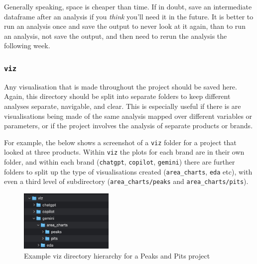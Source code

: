 \documentclass[
  letterpaper,
  DIV=11,
  numbers=noendperiod]{scrreprt}
\begin{document}
\begin{tcolorbox}[enhanced jigsaw, colback=white, opacitybacktitle=0.6, coltitle=black, left=2mm, breakable, bottomtitle=1mm, toptitle=1mm, toprule=.15mm, colframe=quarto-callout-tip-color-frame, titlerule=0mm, title=\textcolor{quarto-callout-tip-color}{\faLightbulb}\hspace{0.5em}{Save liberally}, colbacktitle=quarto-callout-tip-color!10!white, rightrule=.15mm, bottomrule=.15mm, arc=.35mm, opacityback=0, leftrule=.75mm]

Generally speaking, space is cheaper than time. If in doubt, save an
intermediate dataframe after an analysis if you \emph{think} you'll need
it in the future. It is better to run an analysis once and save the
output to never look at it again, than to run an analysis, not save the
output, and then need to rerun the analysis the following week.

\end{tcolorbox}

\subsubsection{\texorpdfstring{\texttt{viz}}{viz}}\label{viz}

Any visualisation that is made throughout the project should be saved
here. Again, this directory should be split into separate folders to
keep different analyses separate, navigable, and clear. This is
especially useful if there is are visualisations being made of the same
analysis mapped over different variables or parameters, or if the
project involves the analysis of separate products or brands.

For example, the below shows a screenshot of a \texttt{viz} folder for a
project that looked at three products. Within \texttt{viz} the plots for
each brand are in their own folder, and within each brand
(\texttt{chatgpt}, \texttt{copilot}, \texttt{gemini}) there are further
folders to split up the type of visualisations created
(\texttt{area\_charts}, \texttt{eda} etc), with even a third level of
subdirectory (\texttt{area\_charts/peaks} and
\texttt{area\_charts/pits}).

\begin{figure}[H]

{\centering \includegraphics[width=0.4\textwidth,height=\textheight]{./img/viz_directory.png}

}

\caption{Example viz directory hierarchy for a Peaks and Pits project}

\end{figure}%
\end{document}
